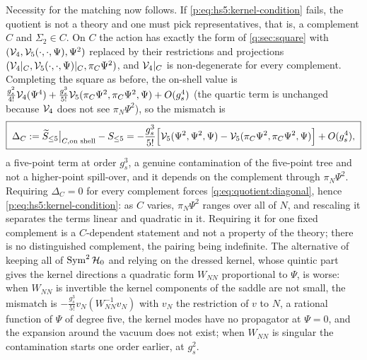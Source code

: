 Necessity for the matching now follows.
If \eqref{p:eq:hs5:kernel-condition} fails, the quotient is not a theory and one must pick representatives, that is, a complement $C$ and $\Sigma_2\in C$.
On $C$ the action has exactly the form of \cref{q:sec:square} with $({\mathcal{V}}_4,{\mathcal{V}}_5(\cdot,\cdot,\Psi),\Psi^2)$ replaced by their restrictions and projections $({\mathcal{V}}_4|_C,{\mathcal{V}}_5(\cdot,\cdot,\Psi)|_C,\pi_C\Psi^2)$, and ${\mathcal{V}}_4|_C$ is non-degenerate for every complement.
Completing the square as before, the on-shell value is $\frac{g_s^2}{4!}{\mathcal{V}}_4(\Psi^4)+\frac{g_s^3}{5!}{\mathcal{V}}_5(\pi_C\Psi^2,\pi_C\Psi^2,\Psi)+O(g_s^4)$ (the quartic term is unchanged because ${\mathcal{V}}_4$ does not see $\pi_N\Psi^2$), so the mismatch is
\begin{equation}
  \label{q:eq:quotient:mismatch}
  \boxed{\;
  \Delta_C
    := \widetilde S_{\le 5}\big|_{C, \text{on shell}} - S_{\le 5}
    = - \frac{g_s^3}{5!} \Big[ {\mathcal{V}}_5(\Psi^2, \Psi^2, \Psi) - {\mathcal{V}}_5(\pi_C \Psi^2, \pi_C \Psi^2, \Psi) \Big] + O(g_s^4),
  \;}
\end{equation}
a five-point term at order $g_s^3$, a genuine contamination of the five-point tree and not a higher-point spill-over, and it depends on the complement through $\pi_N\Psi^2$.
Requiring $\Delta_C=0$ for every complement forces \eqref{q:eq:quotient:diagonal}, hence \eqref{p:eq:hs5:kernel-condition}: as $C$ varies, $\pi_N\Psi^2$ ranges over all of $N$, and rescaling it separates the terms linear and quadratic in it.
Requiring it for one fixed complement is a $C$-dependent statement and not a property of the theory; there is no distinguished complement, the pairing being indefinite.
The alternative of keeping all of $\operatorname{Sym}^2{\mathcal{H}}_0$ and relying on the dressed kernel, whose quintic part gives the kernel directions a quadratic form $W_{NN}$ proportional to $\Psi$, is worse: when $W_{NN}$ is invertible the kernel components of the saddle are not small, the mismatch is $-\frac{g_s^3}{5!}v_N(W_{NN}^{-1}v_N)$ with $v_N$ the restriction of $v$ to $N$, a rational function of $\Psi$ of degree five, the kernel modes have no propagator at $\Psi=0$, and the expansion around the vacuum does not exist; when $W_{NN}$ is singular the contamination starts one order earlier, at $g_s^2$.

